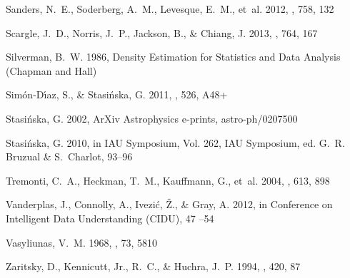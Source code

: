 \documentclass{emulateapj}
\begin{document}
\begin{thebibliography}{}
{Sanders}, N.~E., {Soderberg}, A.~M., {Levesque}, E.~M., {et~al.} 2012, \apj,
  758, 132

{Scargle}, J.~D., {Norris}, J.~P., {Jackson}, B., \& {Chiang}, J. 2013, \apj,
  764, 167

Silverman, B.~W. 1986, Density Estimation for Statistics and Data Analysis
  (Chapman and Hall)

{Sim{\'o}n-D{\'{\i}}az}, S., \& {Stasi{\'n}ska}, G. 2011, \aap, 526, A48+

{Stasi{\'n}ska}, G. 2002, ArXiv Astrophysics e-prints, astro-ph/0207500

{Stasi{\'n}ska}, G. 2010, in IAU Symposium, Vol. 262, IAU Symposium, ed. G.~R.
  {Bruzual} \& S.~{Charlot}, 93--96

{Tremonti}, C.~A., {Heckman}, T.~M., {Kauffmann}, G., {et~al.} 2004, \apj, 613,
  898

{Vanderplas}, J., {Connolly}, A., {Ivezi{\'c}}, {\v Z}., \& {Gray}, A. 2012, in
  Conference on Intelligent Data Understanding (CIDU), 47 --54

{Vasyliunas}, V.~M. 1968, \jgr, 73, 5810

{Zaritsky}, D., {Kennicutt}, Jr., R.~C., \& {Huchra}, J.~P. 1994, \apj, 420, 87

\end{thebibliography}
\end{document}
